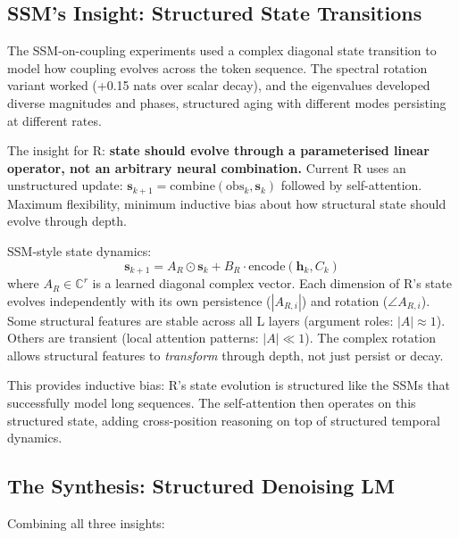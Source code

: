 \documentclass[11pt, a4paper]{article}
\theoremstyle{plain}
\theoremstyle{definition}
\theoremstyle{remark}
\begin{document}
\subsection{SSM's Insight: Structured State Transitions}

The SSM-on-coupling experiments used a complex diagonal state transition to model how coupling evolves across the token sequence.
The spectral rotation variant worked (+0.15 nats over scalar decay), and the eigenvalues developed diverse magnitudes and phases, structured aging with different modes persisting at different rates.

The insight for R: \textbf{state should evolve through a parameterised linear operator, not an arbitrary neural combination.}
Current R uses an unstructured update: $\mathbf{s}_{k+1} = \mathrm{combine}(\mathrm{obs}_k, \mathbf{s}_k)$ followed by self-attention.
Maximum flexibility, minimum inductive bias about how structural state should evolve through depth.

SSM-style state dynamics:
\begin{equation}
\mathbf{s}_{k+1} = A_R \odot \mathbf{s}_k + B_R \cdot \mathrm{encode}(\mathbf{h}_k, C_k)
\end{equation}
where $A_R \in \mathbb{C}^r$ is a learned diagonal complex vector.
Each dimension of R's state evolves independently with its own persistence ($|A_{R,i}|$) and rotation ($\angle A_{R,i}$).
Some structural features are stable across all L layers (argument roles: $|A| \approx 1$).
Others are transient (local attention patterns: $|A| \ll 1$).
The complex rotation allows structural features to \emph{transform} through depth, not just persist or decay.

This provides inductive bias: R's state evolution is structured like the SSMs that successfully model long sequences.
The self-attention then operates on this structured state, adding cross-position reasoning on top of structured temporal dynamics.

\subsection{The Synthesis: Structured Denoising LM}

Combining all three insights:
\end{document}
